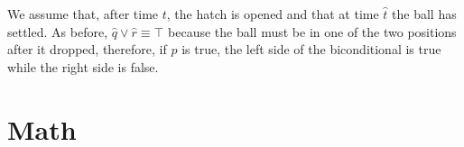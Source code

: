 \documentclass[11pt, executivepaper]{article}
\begin{document}
We assume that, after time $t$, the hatch is opened and that at time $\hat{t}$ the ball has settled. As before, $\hat{q} \vee \hat{r} \equiv \top$ because the ball must be in one of the two positions after it dropped, therefore, if $p$ is true, the left side of the biconditional is true while the right side is false.

%
%
%
%
%
%
%
%
%

\section{Math}
\label{Math}
\end{document}
